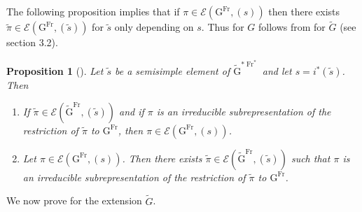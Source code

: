 \documentclass[12pt, reqno]{amsart}
\newtheorem{proposition}[theorem]{Proposition}
\theoremstyle{definition}
\theoremstyle{definition}
\theoremstyle{definition}
\newcommand{\GroupExtension}[1]{\widetilde{#1}}
\newcommand{\Frobenius}{\operatorname{Fr}}
\newcommand{\algebraicGroup}[1]{\boldsymbol{\mathrm{#1}}}
\newcommand{\LusztigSeries}[2]{\mathcal{E}\left(#1, (#2)\right)}
\newcommand{\DualFrobeniusFixedPoints}[2][\Frobenius^{\ast}]{\algebraicGroup{#2}^{\ast #1}}
\newcommand{\FrobeniusFixedPoints}[2][\Frobenius]{\algebraicGroup{#2}^{#1}}
\begin{document}
The following proposition implies that if $\pi \in \LusztigSeries{\FrobeniusFixedPoints{G}}{s}$ then there exists $\tilde{\pi} \in \LusztigSeries{\FrobeniusFixedPoints{G}}{\tilde{s}}$ for $\tilde{s}$ only depending on $s$. Thus  for $G$ follows from  for $\GroupExtension{G}$ (see section 3.2). 

\begin{proposition}[{\cite[Proposition 11.7]{Bonnafe2006}}]
	Let $\tilde{s}$ be a semisimple element of $\DualFrobeniusFixedPoints{\GroupExtension{G}}$ and let $s = i^{\ast}\left(\tilde{s}\right)$. Then
	\begin{enumerate}
		\item If $\tilde{\pi} \in \LusztigSeries{\FrobeniusFixedPoints{\GroupExtension{G}}}{\tilde{s}}$ and if $\pi$ is an irreducible subrepresentation of the restriction of $\tilde{\pi}$ to $\FrobeniusFixedPoints{G}$, then $\pi \in \LusztigSeries{\FrobeniusFixedPoints{G}}{s}$.
		\item Let $\pi \in \LusztigSeries{\FrobeniusFixedPoints{G}}{s}$. Then there exists $\tilde{\pi} \in \LusztigSeries{\FrobeniusFixedPoints{\GroupExtension{G}}}{\tilde{s}}$ such that $\pi$ is an irreducible subrepresentation of the restriction of $\tilde{\pi}$ to $\FrobeniusFixedPoints{G}$.
	\end{enumerate}
\end{proposition}

We now prove  for the extension $\GroupExtension{G}$.
\end{document}
